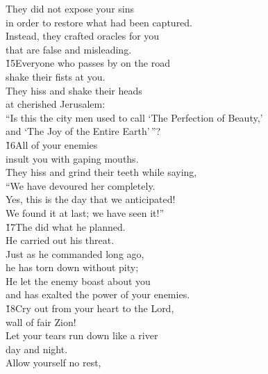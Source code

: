 \begin{poetry}
\poeml They did not expose your sins \\
\poemll    in order to restore what had been captured. \\
\poeml Instead, they crafted oracles for you \\
\poemll    that are false and misleading. \\
\poeml \v{15}Everyone who passes by on the road \\
\poemll    shake their fists at you. \\
\poeml They hiss and shake their heads \\
\poemll    at cherished Jerusalem: \\
\poeml ``Is this the city men used to call `The Perfection of Beauty,' \\
\poemll    and `The Joy of the Entire Earth'\,''? \\
\poeml \v{16}All of your enemies \\
\poemll    insult you with gaping mouths. \\
\poeml They hiss and grind their teeth while saying, \\
\poemll    ``We have devoured her completely. \\
\poeml Yes, this is the day that we anticipated! \\
\poemll    We found it at last; we have seen it!'' \\
\poeml \v{17}The  did what he planned. \\
\poemll    He carried out his threat. \\
\poeml Just as he commanded long ago, \\
\poemll    he has torn down without pity; \\
\poeml He let the enemy boast about you \\
\poemll    and has exalted the power of your enemies. \\
\poeml \v{18}Cry out from your heart to the Lord, \\
\poemll    wall of fair Zion! \\
\poeml Let your tears run down like a river \\
\poemll    day and night. \\
\poeml Allow yourself no rest, \\

\end{poetry}
